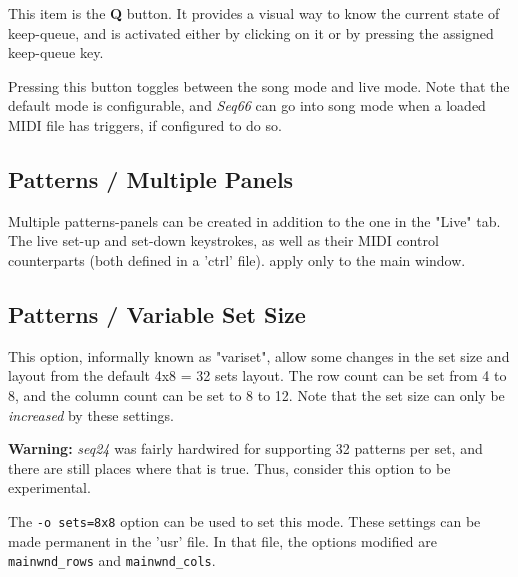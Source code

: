   This item is the \textbf{Q} button.
   It provides a visual way to know the current state of keep-queue, and is
   activated either by clicking on it or by pressing the assigned keep-queue
   key.

   Pressing this button toggles between the song mode and live mode.
   Note that the default mode is configurable, and \textsl{Seq66} can go into
   song mode when a loaded MIDI file has triggers, if configured to do so.

\subsection{Patterns / Multiple Panels}
\label{subsec:patterns_panel_multiple}

   Multiple patterns-panels can be created in addition to the one in the "Live"
   tab.  The live set-up and set-down keystrokes, as well as their MIDI control
   counterparts (both defined in a 'ctrl' file).
   apply only to the main window.

%
%

\subsection{Patterns / Variable Set Size}
\label{subsec:patterns_panel_variset}

   This option, informally known as "variset", allow some changes in
   the set size and layout from the default 4x8 = 32 sets layout.
   The row count can be set from 4 to 8, and the column count can be set to 8
   to 12.  Note that the set size can only be \textsl{increased} by these
   settings.

   \textbf{Warning:}
   \textsl{seq24} was fairly hardwired for supporting 32 patterns per
   set, and there are still places where that is true.  Thus,
   consider this option to be experimental.

   The \texttt{-o sets=8x8} option can be used to set this mode.
   These settings can be made permanent in the 'usr' file.
   In that file, the options modified are \texttt{mainwnd\_rows} and
   \texttt{mainwnd\_cols}.

